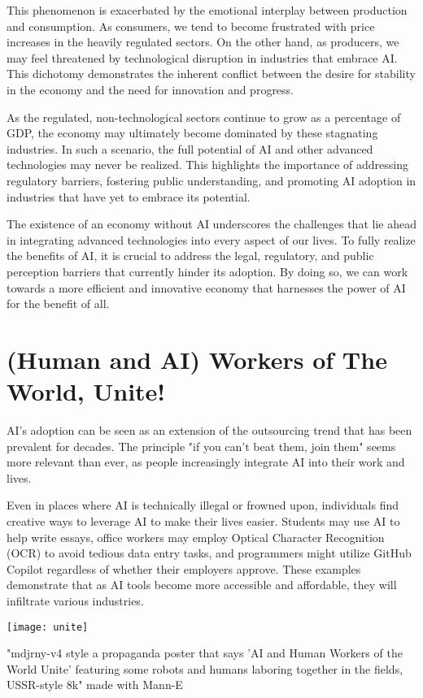 This phenomenon is exacerbated by the emotional interplay between production and consumption. As consumers, we tend to become frustrated with price increases in the heavily regulated sectors. On the other hand, as producers, we may feel threatened by technological disruption in industries that embrace AI. This dichotomy demonstrates the inherent conflict between the desire for stability in the economy and the need for innovation and progress.

As the regulated, non-technological sectors continue to grow as a percentage of GDP, the economy may ultimately become dominated by these stagnating industries. In such a scenario, the full potential of AI and other advanced technologies may never be realized. This highlights the importance of addressing regulatory barriers, fostering public understanding, and promoting AI adoption in industries that have yet to embrace its potential.

The existence of an economy without AI underscores the challenges that lie ahead in integrating advanced technologies into every aspect of our lives. To fully realize the benefits of AI, it is crucial to address the legal, regulatory, and public perception barriers that currently hinder its adoption. By doing so, we can work towards a more efficient and innovative economy that harnesses the power of AI for the benefit of all.


\section{(Human and AI) Workers of The World, Unite!}

AI's adoption can be seen as an extension of the outsourcing trend that has been prevalent for decades. The principle "if you can't beat them, join them" seems more relevant than ever, as people increasingly integrate AI into their work and lives.

Even in places where AI is technically illegal or frowned upon, individuals find creative ways to leverage AI to make their lives easier. Students may use AI to help write essays, office workers may employ Optical Character Recognition (OCR) to avoid tedious data entry tasks, and programmers might utilize GitHub Copilot regardless of whether their employers approve. These examples demonstrate that as AI tools become more accessible and affordable, they will infiltrate various industries.

\begin{marginfigure}[-5.5cm]
    \texttt{[image: unite]}
        \caption{"mdjrny-v4 style a propaganda poster that says 'AI and Human Workers of the World Unite' featuring some robots and humans laboring together in the fields, USSR-style 8k" made with Mann-E}
\end{marginfigure}

